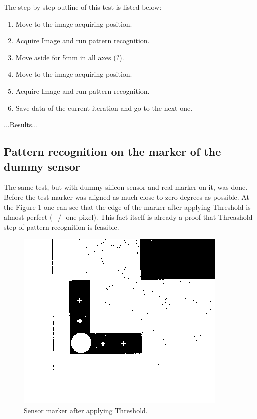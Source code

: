 The step-by-step outline of this test is listed below:
\begin{enumerate}
\item Move to the image acquiring position.
\item Acquire Image and run pattern recognition.
\item Move aside for 5mm \underline{in all axes (?)}.
\item Move to the image acquiring position.
\item Acquire Image and run pattern recognition.
\item Save data of the current iteration and go to the next one.
\end{enumerate}

...Results...

\subsection{Pattern recognition on the marker of the dummy sensor}

The same test, but with dummy silicon sensor and real marker on it, was done. Before the test marker was aligned as much close to zero degrees as possible. At the Figure \ref{fig:thresholded_marker} one can see that the edge of the marker after applying Threshold is almost perfect (+/- one pixel). This fact itself is already a proof that Threashold step of pattern recognition is feasible.

\begin{figure}[ht]\centering
\includegraphics[width=0.8\linewidth]{Data/Precision_tests/Thresholded_marker.png}
\caption{Sensor marker after applying Threshold.}
\label{fig:thresholded_marker}
\end{figure}

